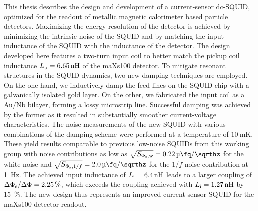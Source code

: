 \noindent
This thesis describes the design and development of a current-sensor dc-SQUID, optimized for the readout of metallic magnetic calorimeter based particle detectors. Maximizing the energy resolution of the detector is achieved by minimizing the intrinsic noise of the SQUID and by matching the input inductance of the SQUID with the inductance of the detector. The design developed here features a two-turn input coil to better match the pickup coil inductance $L_{\rm p}=\qty{6.65}{\nH}$ of the maXs100 detector. To mitigate resonant structures in the SQUID dynamics, two new damping techniques are employed. 
On the one hand, we inductively damp the feed lines on the SQUID chip with a galvanically isolated gold layer. On the other, we fabricated the input coil as a Au/Nb bilayer, forming a lossy microstrip line.  
Successful damping was achieved by the former as it resulted in substantially smoother current-voltage characteristics. The noise measurements of the new SQUID with various combinations of the damping scheme were performed at a temperature of $\qty{10}{\milli\kelvin}$. 
These yield results comparable to previous low-noise SQUIDs from this working group with noise contributions as low as  $\sqrt{S_{\Phi_{\rm s}, \rm w}}=\qty{0.22}{\micro\fq\per\sqrthz}$ for the white noise and $\sqrt{S_{\Phi_{\rm s}, 1/f}}=\qty{2.0}{\micro\fq\per\sqrthz}$ for the $1/f$ noise contribution at \qty{1}{\Hz}. The achieved input inductance of $L_{\rm i}=\qty{6.4}{\nH}$ leads to a larger coupling of $\Delta\Phi_{\rm s}/\Delta\Phi=\qty{2.25}{\percent}$, which exceeds the coupling achieved with $L_{\rm i}=\qty{1.27}{\nH}$ by \qty{15}{\percent}. The new design thus represents an improved current-sensor SQUID for the maXs100 detector readout.


